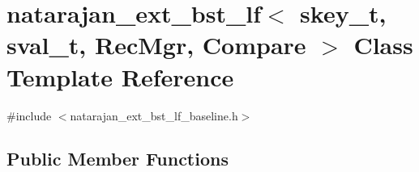 \hypertarget{classnatarajan__ext__bst__lf}{}\section{natarajan\+\_\+ext\+\_\+bst\+\_\+lf$<$ skey\+\_\+t, sval\+\_\+t, Rec\+Mgr, Compare $>$ Class Template Reference}
\label{classnatarajan__ext__bst__lf}


{\ttfamily \#include $<$natarajan\+\_\+ext\+\_\+bst\+\_\+lf\+\_\+baseline.\+h$>$}

\subsection*{Public Member Functions}
